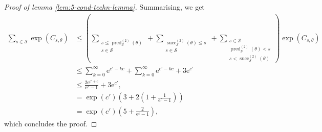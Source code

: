 \documentclass{article}
\theoremstyle{definition}
\theoremstyle{definition}
\newcommand{\e}{\mathrm{e}}
\begin{document}
\begin{proof}[Proof of lemma \ref{lem:5-cond-techn-lemma}]
    Summarising, we get
    \begin{align*}
        \sum_{s\in\mathcal{S}}
            \exp(C_{s,\theta}) &\le
            \left(\sum_{\substack{s \le \operatorname{pred}_{\mathcal{S}}^{(2)}(\theta) \\ s\in\mathcal{S}}}
            +
            \sum_{\substack{\operatorname{succ}_{\mathcal{S}}^{(2)}(\theta) \le s \\ s\in\mathcal{S}}}
            +
            \sum_{\substack{s\in \mathcal{S} \\ \operatorname{pred}_{\mathcal{S}}^{(2)}(\theta) < s \\ s < \operatorname{succ}_{\mathcal{S}}^{(2)}(\theta)}}
            \right) \exp(C_{s,\theta})
            \\
            &\le \sum_{k=0}^\infty \e^{c'-kc}  + \sum_{k=0}^\infty \e^{c'-kc} + 3\e^{c'}
            \\
            &\le \frac{2\e^{c'+c}}{\e^c - 1} + 3\e^{c'},
            \\
            &=
            \exp(c')\left(
            3 + 2\left(
                    1+\frac{1}{\e^c - 1}
                \right)
            \right)
            \\
            &= \exp(c') \left(5 + \frac{2}{\e^c - 1} \right)
            ,
    \end{align*}
    which concludes the proof.
\end{proof}
\end{document}

